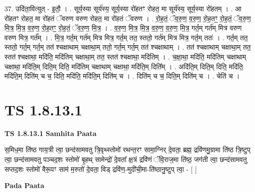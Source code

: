 \documentclass[17pt]{extarticle}
\begin{document}
37. उदि॑ता॒वित्युत् - इ॒तौ॒ । . सूर्य॒स्या सूर्य॑स्य॒ सूर्य॒स्या रो॑हतꣳ रोहत॒ मा सूर्य॑स्य॒ सूर्य॒स्या रो॑हतम् । . आ रो॑हतꣳ रोहत॒ मा रो॑हतं ॅवरुण वरुण रोहत॒ मा रो॑हतं ॅवरुण । . रो॒ह॒तं॒ ॅव॒रु॒ण॒ व॒रु॒ण॒ रो॒ह॒तꣳ॒॒ रो॒ह॒तं॒ ॅव॒रु॒ण॒ मि॒त्र॒ मि॒त्र॒ व॒रु॒ण॒ रो॒ह॒तꣳ॒॒ रो॒ह॒तं॒ ॅव॒रु॒ण॒ मि॒त्र॒ । . व॒रु॒ण॒ मि॒त्र॒ मि॒त्र॒ व॒रु॒ण॒ व॒रु॒ण॒ मि॒त्र॒ गर्त॒म् गर्त॑म् मित्र वरुण वरुण मित्र॒ गर्त᳚म् । . मि॒त्र॒ गर्त॒म् गर्त॑म् मित्र मित्र॒ गर्त॒म् तत॒ स्ततो॒ गर्त॑म् मित्र मित्र॒ गर्त॒म् ततः॑ । . गर्त॒म् तत॒ स्ततो॒ गर्त॒म् गर्त॒म् तत॑ श्चक्षाथाम् चक्षाथा॒म् ततो॒ गर्त॒म् गर्त॒म् तत॑ श्चक्षाथाम् । . तत॑ श्चक्षाथाम् चक्षाथा॒म् तत॒ स्तत॑ श्चक्षाथा॒ मदि॑ति॒ मदि॑तिम् चक्षाथा॒म् तत॒ स्तत॑ श्चक्षाथा॒ मदि॑तिम् । . च॒क्षा॒था॒ मदि॑ति॒ मदि॑तिम् चक्षाथाम् चक्षाथा॒ मदि॑ति॒म् दिति॒म् दिति॒ मदि॑तिम् चक्षाथाम् चक्षाथा॒ मदि॑ति॒म् दिति᳚म् । . अदि॑ति॒म् दिति॒म् दिति॒ मदि॑ति॒ मदि॑ति॒म् दिति॑म् च च॒ दिति॒ मदि॑ति॒ मदि॑ति॒म् दिति॑म् च । . दिति॑म् च च॒ दिति॒म् दिति॑म् च । . चेति॑ च । \newline
\pagebreak
{}

\section{ TS 1.8.13.1 }

\textbf{TS 1.8.13.1 } \newline
\textbf{Samhita Paata} \newline

स॒मिध॒मा ति॑ष्ठ गाय॒त्री त्वा॒ छन्द॑सामवतु त्रि॒वृथ्स्तोमो॑ रथन्त॒रꣳ सामा॒ग्निर् दे॒वता॒ ब्रह्म॒ द्रवि॑णमु॒ग्रामा ति॑ष्ठ त्रि॒ष्टुप् त्वा॒ छन्द॑सामवतु पञ्चद॒शः स्तोमो॑ बृ॒हथ् सामेन्द्रो॑ दे॒वता᳚ क्ष॒त्रं द्रवि॑णं ॅवि॒राज॒मा ति॑ष्ठ॒ जग॑ती त्वा॒ छन्द॑सामवतु सप्तद॒शः स्तोमो॑ वैरू॒पꣳ साम॑ म॒रुतो॑ दे॒वता॒ विड् द्रवि॑ण॒-मुदी॑ची॒मा-ति॑ष्ठानु॒ष्टुप् त्वा॒ - [ ] \newline

\textbf{Pada Paata} \newline
\end{document}
